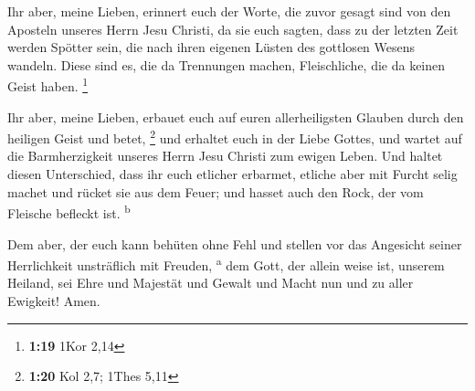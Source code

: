  Ihr aber, meine Lieben, erinnert euch der Worte, die
zuvor gesagt sind von den Aposteln unseres Herrn Jesu Christi,
 da sie euch sagten, dass zu der letzten Zeit werden
Spötter sein, die nach ihren eigenen Lüsten des gottlosen Wesens
wandeln.  Diese sind es, die da Trennungen machen,
Fleischliche, die da keinen Geist haben. \footnote{\textbf{1:19} 1Kor
  2,14}

 Ihr aber, meine Lieben, erbauet euch auf euren
allerheiligsten Glauben durch den heiligen Geist und betet, \footnote{\textbf{1:20}
  Kol 2,7; 1Thes 5,11}  und erhaltet euch in der Liebe
Gottes, und wartet auf die Barmherzigkeit unseres Herrn Jesu Christi zum
ewigen Leben.  Und haltet diesen Unterschied, dass ihr
euch etlicher erbarmet,  etliche aber mit Furcht selig
machet und rücket sie aus dem Feuer; und hasset auch den Rock, der vom
Fleische befleckt ist. \textsuperscript{b}

 Dem aber, der euch kann behüten ohne Fehl und stellen
vor das Angesicht seiner Herrlichkeit unsträflich mit Freuden,
\textsuperscript{a}  dem Gott, der allein weise ist,
unserem Heiland, sei Ehre und Majestät und Gewalt und Macht nun und zu
aller Ewigkeit! Amen.
